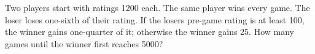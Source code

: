 Two players start with ratings 1200 each. The same player wins every game. The loser loses one-sixth of their rating. If the loser\textquotesingle s pre-game rating is at least 100, the winner gains one-quarter of it; otherwise the winner gains 25. How many games until the winner first reaches 5000?
